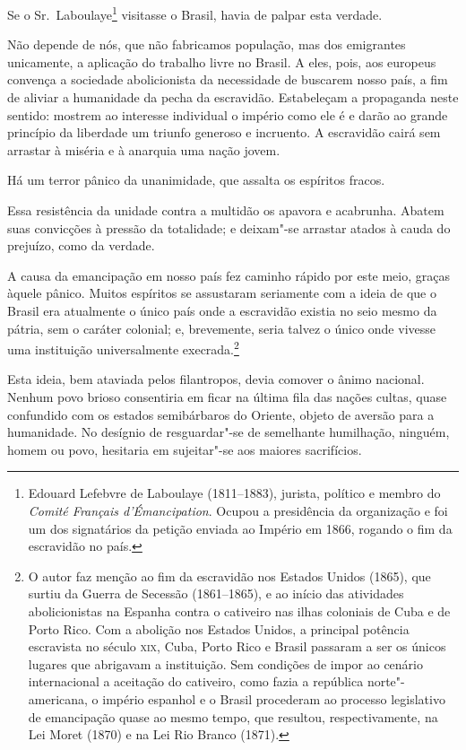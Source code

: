  Se o Sr.~Laboulaye\footnote{ Edouard Lefebvre de Laboulaye (1811--1883), 
jurista, político e membro do \textit{Comité Français d'Émancipation}. Ocupou a
presidência da organização e foi um dos signatários da petição enviada ao Império 
em 1866, rogando o fim da escravidão no país.} visitasse o Brasil, havia de palpar esta verdade. 

 Não depende de nós, que não fabricamos população, mas dos emigrantes
unicamente, a aplicação do trabalho livre no Brasil. A eles, pois, aos
europeus convença a sociedade abolicionista da necessidade de buscarem
nosso país, a fim de aliviar a humanidade da pecha da escravidão.
Estabeleçam a propaganda neste sentido: mostrem ao interesse individual
o império como ele é e darão ao grande princípio da liberdade um
triunfo generoso e incruento. A escravidão cairá sem arrastar à miséria
e à anarquia uma nação jovem.

\setcounter{@sectionNumCenter}{10}

\sectionitem

 Há um terror pânico da unanimidade, que assalta os espíritos fracos.

 Essa resistência da unidade contra a multidão os apavora e acabrunha.
Abatem suas convicções à pressão da totalidade; e deixam"-se arrastar
atados à cauda do prejuízo, como da verdade. 

 A causa da emancipação em nosso país fez caminho rápido por este meio,
graças àquele pânico. Muitos espíritos se assustaram seriamente com a
ideia de que o Brasil era atualmente o único país onde a escravidão
existia no seio mesmo da pátria, sem o caráter colonial; e, brevemente,
seria talvez o único onde vivesse uma instituição universalmente
execrada.\footnote{ O autor faz menção ao fim da escravidão nos Estados Unidos (1865), que surtiu
da Guerra de Secessão (1861--1865), e ao início das atividades
abolicionistas na Espanha contra o cativeiro nas ilhas coloniais de
Cuba e de Porto Rico. Com a abolição nos Estados Unidos, a principal
potência escravista no século \textsc{xix}, Cuba, Porto Rico e Brasil passaram a
ser os únicos lugares que abrigavam a instituição. Sem condições de
impor ao cenário internacional a aceitação do cativeiro, como fazia a
república norte"-americana, o império espanhol e o Brasil procederam
ao processo legislativo de emancipação quase ao mesmo tempo, que
resultou, respectivamente, na Lei Moret (1870) e na Lei Rio Branco (1871).}

 Esta ideia, bem ataviada pelos filantropos, devia comover o ânimo
nacional. Nenhum povo brioso consentiria em ficar na última fila das
nações cultas, quase confundido com os estados semibárbaros do Oriente,
objeto de aversão para a humanidade. No desígnio de resguardar"-se de
semelhante humilhação, ninguém, homem ou povo, hesitaria em
sujeitar"-se aos maiores sacrifícios.


